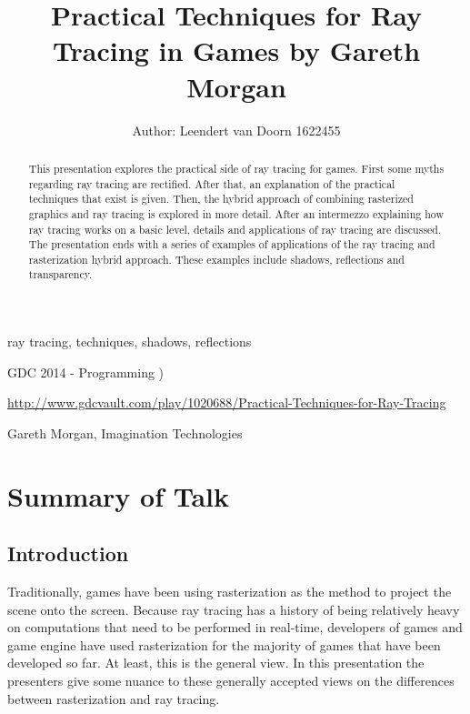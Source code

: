 \documentclass[a4paper]{article}
\title{Practical Techniques for Ray Tracing in Games by Gareth Morgan}
\author{Author: Leendert van Doorn 1622455}
\begin{document}
\maketitle

\begin{keywords} ray tracing, techniques, shadows, reflections \end{keywords}

\begin{track} GDC 2014 - Programming ) \end{track}

\begin{talkurl}  \url{http://www.gdcvault.com/play/1020688/Practical-Techniques-for-Ray-Tracing} \end{talkurl}

\begin{speaker}Gareth Morgan, Imagination Technologies \end{speaker}


\begin{abstract}
This presentation explores the practical side of ray tracing for games. First some myths regarding ray tracing are rectified. After that, an explanation of the practical techniques that exist is given. Then, the hybrid approach of combining rasterized graphics and ray tracing is explored in more detail. After an intermezzo explaining how ray tracing works on a basic level, details and applications of ray tracing are discussed. The presentation ends with a series of examples of applications of the ray tracing and rasterization hybrid approach. These examples include shadows, reflections and transparency. 

\end{abstract}

\section{Summary of Talk}

\subsection{Introduction}
Traditionally, games have been using rasterization as the method to project the scene onto the screen. Because ray tracing has a history of being relatively heavy on computations that need to be performed in real-time, developers of games and game engine have used rasterization for the majority of games that have been developed so far. At least, this is the general view. In this presentation the presenters give some nuance to these generally accepted views on the differences between rasterization and ray tracing. 
\end{document}
